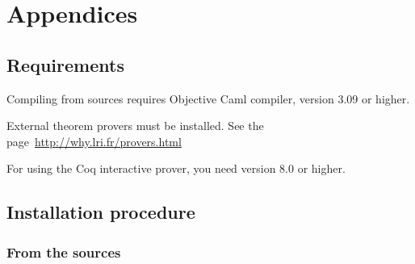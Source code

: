 \documentclass[a4paper,11pt,twoside,openright]{report}
\begin{document}




\chapter{Appendices}

\section{Requirements}
\label{app:requirements}


Compiling from sources requires Objective Caml
compiler, version 3.09 or higher.

External theorem provers must be installed. See the page~\url{http://why.lri.fr/provers.html}

For using the Coq interactive prover, you need \Coq{} version 8.0 or
higher.

\section{Installation procedure}

\subsection{From the sources}
\end{document}
